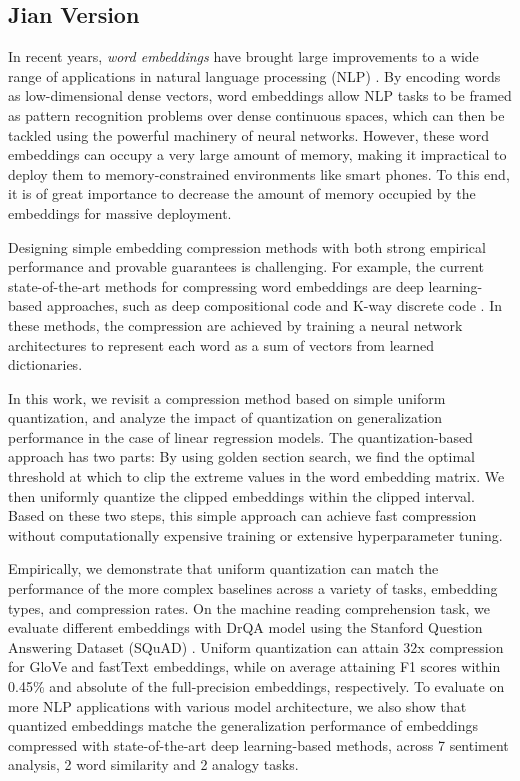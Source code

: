 \subsection{Jian Version}
In recent years, \textit{word embeddings} \citep{word2vec13,glove14,fasttext18} have brought large improvements to a wide range of applications in natural language processing (NLP) \citep{collins16,drqa17}.
By encoding words as low-dimensional dense vectors, word embeddings allow NLP tasks to be framed as pattern recognition problems over dense continuous spaces, which can then be tackled using the powerful machinery of neural networks.
However, these word embeddings can occupy a very large amount of memory, making it impractical to deploy them to memory-constrained environments like smart phones.
To this end, it is of great importance to decrease the amount of memory occupied by the embeddings for massive deployment.


Designing simple embedding compression methods with both strong empirical performance and provable guarantees is challenging.
For example, the current state-of-the-art methods for compressing word embeddings are deep learning-based approaches, such as deep compositional code \citep{dccl17} and K-way discrete code \citep{chen2018learning}. In these methods, the compression are achieved by training a neural network architectures to represent each word as a sum of vectors from learned dictionaries.


In this work, we revisit a compression method based on simple uniform quantization, and analyze the impact of quantization on generalization performance in the case of linear regression models.
The quantization-based approach has two parts: By using golden section search, we find the optimal threshold at which to clip the extreme values in the word embedding matrix. We then uniformly quantize the clipped embeddings within the clipped interval. Based on these two steps, this simple approach can achieve fast compression without computationally expensive training or extensive hyperparameter tuning.

Empirically, we demonstrate that uniform quantization can match the performance of the more complex baselines across a variety of tasks, embedding types, and compression rates.
On the machine reading comprehension task, we evaluate different embeddings with DrQA model \cite{drqa17} using the Stanford Question Answering Dataset (SQuAD) \citep{squad16}. Uniform quantization can attain 32x compression for GloVe and fastText embeddings, while on average attaining F1 scores within 0.45\% and  absolute of the full-precision embeddings, respectively. To evaluate on more NLP applications with various model architecture, we also show that quantized embeddings matche the generalization performance of embeddings compressed with state-of-the-art deep learning-based methods, across 7 sentiment analysis, 2 word similarity and 2 analogy tasks. 

